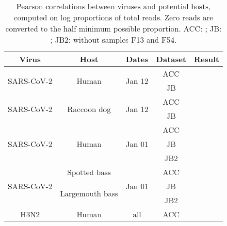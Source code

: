 \documentclass[11pt]{article}
\def \sct {\mbox{SARS-CoV-2}}
\begin{document}
\begin{table}
{\small
\def \sepline {0.75em}
\begin{tabular}{c  c  c  c  l}
\bf Virus & \bf Host & \bf Dates & \bf Dataset & \bf Result \\ \hline
\multirow{2}{*}{\sct{}} & \multirow{2}{*}{Human} & \multirow{2}{*}{Jan 12} & ACC & \ACCTwelfthSCHS{} \\
&&& JB &  \JBTwelfthSCHS{} \\[\sepline]
\multirow{2}{*}{\sct{}} & \multirow{2}{*}{Raccoon dog} & \multirow{2}{*}{Jan 12} & ACC & \ACCTwelfthSCRD{} \\
&&& JB &  \JBTwelfthSCRD{} \\[\sepline]
\multirow{3}{*}{\sct{}} & \multirow{3}{*}{Human} & \multirow{3}{*}{Jan 01} & ACC & \ACCFirstSCHS{} \\
&&& JB &  \JBFirstSCHS{} \\
&&& JB2 &  \JBFirstSCHStwo{} \\[\sepline]
%
\multirow{3}{*}{\sct{}} & Spotted bass& \multirow{3}{*}{Jan 01} & ACC & \ACCFirstSCSB{} \\
& \multirow{2}{*}{Largemouth bass} && JB &  \JBFirstSCLB{} \\
& && JB2 &  \JBFirstSCLBtwo{} \\
[\sepline]
\multirow{1}{*}{H3N2} & \multirow{1}{*}{Human} & \multirow{1}{*}{all} & ACC & \ACCAllHNHS{} \\[\sepline] %
\end{tabular}
}
\caption{Pearson correlations between viruses and potential hosts, computed on log proportions of total reads. Zero reads are converted to the half minimum possible proportion. ACC: \citet{ACC2023bioRxiv}; JB: \citet{Bloom2023VE}; JB2:  \citet{Bloom2023VE} without samples F13 and F54. }
\label{tab:summarycor}
\end{table}
\end{document}
